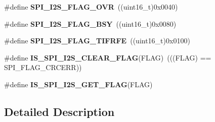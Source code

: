 \begin{DoxyCompactItemize}
\item 
\hypertarget{group___s_p_i___i2_s__flags__definition_ga42001f769835f133600a021a29764254}{\#define {\bfseries S\-P\-I\-\_\-\-I2\-S\-\_\-\-F\-L\-A\-G\-\_\-\-O\-V\-R}~((uint16\-\_\-t)0x0040)}\label{group___s_p_i___i2_s__flags__definition_ga42001f769835f133600a021a29764254}

\item 
\hypertarget{group___s_p_i___i2_s__flags__definition_ga4551095df1365cf2a760282a34279b3c}{\#define {\bfseries S\-P\-I\-\_\-\-I2\-S\-\_\-\-F\-L\-A\-G\-\_\-\-B\-S\-Y}~((uint16\-\_\-t)0x0080)}\label{group___s_p_i___i2_s__flags__definition_ga4551095df1365cf2a760282a34279b3c}

\item 
\hypertarget{group___s_p_i___i2_s__flags__definition_gae5996e849f4178d77520f26a34be4733}{\#define {\bfseries S\-P\-I\-\_\-\-I2\-S\-\_\-\-F\-L\-A\-G\-\_\-\-T\-I\-F\-R\-F\-E}~((uint16\-\_\-t)0x0100)}\label{group___s_p_i___i2_s__flags__definition_gae5996e849f4178d77520f26a34be4733}

\item 
\hypertarget{group___s_p_i___i2_s__flags__definition_gab16c7f47712871b8f1b97de43841856f}{\#define {\bfseries I\-S\-\_\-\-S\-P\-I\-\_\-\-I2\-S\-\_\-\-C\-L\-E\-A\-R\-\_\-\-F\-L\-A\-G}(F\-L\-A\-G)~(((F\-L\-A\-G) == S\-P\-I\-\_\-\-F\-L\-A\-G\-\_\-\-C\-R\-C\-E\-R\-R))}\label{group___s_p_i___i2_s__flags__definition_gab16c7f47712871b8f1b97de43841856f}

\item 
\#define {\bfseries I\-S\-\_\-\-S\-P\-I\-\_\-\-I2\-S\-\_\-\-G\-E\-T\-\_\-\-F\-L\-A\-G}(F\-L\-A\-G)
\end{DoxyCompactItemize}


\subsection{Detailed Description}


